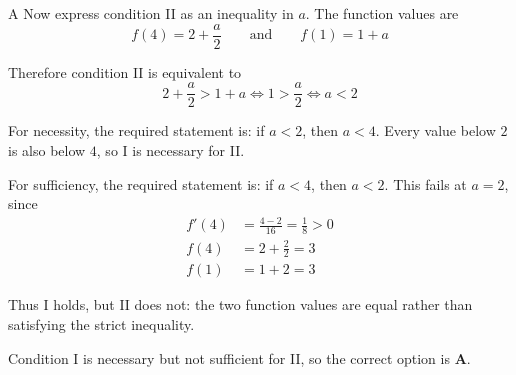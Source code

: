 \documentclass[11pt,a4paper]{article}
\begin{document}
\begin{enumerate}[label=\textbf{\arabic*.},leftmargin=*,itemsep=0pt,start=20]
\begin{djsSolution}{A}
Now express condition II as an inequality in $a$. The function values are
\[
f(4)=2+\frac a2
\qquad\text{and}\qquad
f(1)=1+a
\]

Therefore condition II is equivalent to
\[
2+\frac a2>1+a
\iff 1>\frac a2
\iff\boxed{a<2}
\]

For necessity, the required statement is: if $a<2$, then $a<4$. Every value below $2$ is also below $4$, so I is necessary for II.

For sufficiency, the required statement is: if $a<4$, then $a<2$. This fails at $a=2$, since
\[
\begin{aligned}
f'(4)&=\frac{4-2}{16}=\frac18>0\\[8pt]
f(4)&=2+\frac22=3\\[8pt]
f(1)&=1+2=3
\end{aligned}
\]

Thus I holds, but II does not: the two function values are equal rather than satisfying the strict inequality.

Condition I is necessary but not sufficient for II, so the correct option is \textbf{A}.
\end{djsSolution}
\end{enumerate}
\end{document}
